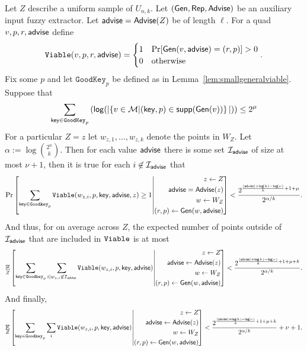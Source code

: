 \begin{lemma}
\label{lem:info loss}
Let $Z$ describe a uniform sample of $U_{n,k}$.  Let $({\mathsf{Gen}}, {\mathsf{Rep}}, {\mathsf{Advise}})$ be an auxiliary input fuzzy extractor.  Let ${\mathsf{advise}} = {\mathsf{Advise}}(Z)$ be of length $\ell$.  For a quad $v, p, r, {\mathsf{advise}}$ define 
\[
\mathtt{Viable}(v, p, r, {\mathsf{advise}}) = \begin{cases} 1& \Pr[{\mathsf{Gen}}(v, {\mathsf{advise}}) = (r, p)]>0\\0&\text{otherwise}\end{cases}.\]
Fix some $p$ and let $\mathtt{GoodKey}_p$ be defined as in Lemma~\ref{lem:smallgeneralviable}. Suppose that 
\[
   \sum_{\mathsf{key}\in \mathtt{GoodKey}_p} \left( \mathsf{log}\!\left(|\!\left\{ v \in \mathcal{M}|\!\left(\mathsf{key}, p\right) \in \mathsf{supp}\!\left(\mathsf{Gen}(v)\right) \right\}|\right)\right) \le 2^\mu 
 \]
 For a particular $Z=z$ let $w_{z,1},..., w_{z,k}$ denote the points in $W_Z$. Let $\alpha:= \log {2^n\choose k}$.  
 Then for each value ${\mathsf{advise}}$ there is some set $\mathcal{I}_{{\mathsf{advise}}}$ of size at most $\nu+1$, then it is true for each $i\not \in \mathcal{I}_{\mathsf{advise}}$ that
\[
\Pr\left[\sum_{\mathsf{key} \in \mathtt{Goodkey}_p} \mathtt{Viable}(w_{z,i}, p, \mathsf{key}, {\mathsf{advise}}, z) \ge 1\middle| \begin{aligned} z\leftarrow Z\\ {\mathsf{advise}}= {\mathsf{Advise}}(z)\\w\leftarrow W_Z\\(r, p)\leftarrow {\ensuremath{\mathsf{Gen}}}(w, {\mathsf{advise}}) \end{aligned} \right]< \frac{2^{\frac{|{\mathsf{advise}}|+\mathsf{log}\!\left(k\right)-\mathsf{log}\!\left(\nu\right)}{k}+1+\mu}}{{2^{\alpha/k}}}.
\]
And thus, for on average across $Z$, the expected number of points outside of $\mathcal{I}_{\mathsf{advise}}$ that are included in $\mathtt{Viable}$ is at most 
\begin{align*}
\operatorname*{\mathbb{E}}_{Z} \left[\sum_{\mathsf{key} \in \mathtt{Goodkey}_p}\sum_{i | w_{z,i}\not\in\mathcal{I}_{\mathsf{advise}}} \mathtt{Viable}(w_{z,i}, p, \mathsf{key}, {\mathsf{advise}}) \middle| \begin{aligned} z\leftarrow Z\\ {\mathsf{advise}}\leftarrow {\ensuremath{\mathsf{Advise}}}(z)\\w\leftarrow W_Z\\(r, p)\leftarrow {\ensuremath{\mathsf{Gen}}}(w, {\mathsf{advise}})\end{aligned} \right]< \frac{2^{\frac{|{\mathsf{advise}}|+\mathsf{log}\!\left(k\right)-\mathsf{log}\!\left(\nu\right)}{k}+1+\mu+k}}{{2^{\alpha/k}}}.
\end{align*}
And finally, 
\begin{align*}
\operatorname*{\mathbb{E}}_{Z} \left[\sum_{\mathsf{key} \in \mathtt{Goodkey}_p}\sum_{i }  \mathtt{Viable}(w_{z,i}, p, \mathsf{key}, {\mathsf{advise}}) \middle| \begin{aligned} z\leftarrow Z\\ {\mathsf{advise}}\leftarrow {\ensuremath{\mathsf{Advise}}}(z)\\w\leftarrow W_Z\\(r, p)\leftarrow {\ensuremath{\mathsf{Gen}}}(w, {\mathsf{advise}})\end{aligned} \right]< \frac{2^{\frac{|{\mathsf{advise}}|+\mathsf{log}\!\left(k\right)-\mathsf{log}\!\left(\nu\right)}{k}+1+\mu+k}}{{2^{\alpha/k}}}+\nu+1.
\end{align*}

\end{lemma}
